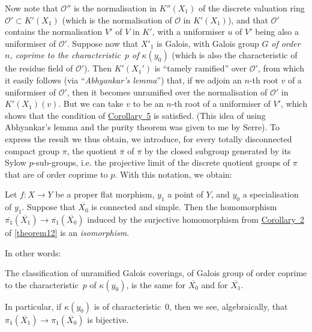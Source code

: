 \documentclass{article}
\theoremstyle{plain}
\newenvironment{theorem}[1]
  {\renewcommand\theinnercustomtheorem{#1}\innercustomtheorem}
  {\endinnercustomtheorem}
\newenvironment{corollary}[1]
  {\renewcommand\theinnercustomcorollary{#1}\innercustomcorollary}
  {\endinnercustomcorollary}
\theoremstyle{definition}
\newcommand{\sh}[1]{{\mathscr{#1}}}
\newcommand{\kres}{\kappa}
\newcommand{\oldpage}[1]{\marginpar{\footnotesize$\Big\vert$ \textit{p.~#1}}}
\begin{document}
Now note that $\sh{O}''$ is the normalisation in $K''(X_1)$ of the discrete valuation ring $\sh{O}'\subset K'(X_1)$ (which is the normalisation of $\sh{O}$ in $K'(X_1)$), and that $\sh{O}'$ contains the normalisation $V'$ of $V$ in $K'$, with a uniformiser $u$ of $V'$ being also a uniformiser of $\sh{O}'$.
Suppose now that $X'_1$ is Galois, with Galois group $G$ \emph{of order $n$, coprime to the characteristic~$p$ of $\kres(y_0)$} (which is also the characteristic of the residue field of $\sh{O}'$).
Then $K'(X_1')$ is ``tamely ramified'' over $\sh{O}'$, from which it easily follows (via ``\emph{Abhyankar's lemma}'') that, if we adjoin an $n$-th root $v$ of a uniformiser of $\sh{O}'$, then it becomes unramified over the normalisation of $\sh{O}'$ in $K'(X_1)(v)$.
But we can take $v$ to be an $n$-th root of a uniformiser of $V'$, which shows that the condition of \hyperref[theorem12corollary5]{Corollary~5} is satisfied.
(This idea of using Abhyankar's lemma and the purity theorem was given to me by Serre).
To express the result we thus obtain, we introduce, for every totally disconnected compact group $\pi$, the quotient $\overline{\pi}$ of $\pi$ by the closed subgroup generated by its Sylow $p$-sub-groups, i.e. the projective limit of the discrete quotient groups of $\pi$ that are of order coprime to $p$.
With this notation, we obtain:

\begin{theorem}{13}
\label{theorem13}
  Let $f\colon X\to Y$ be a proper flat morphism, $y_1$ a point of $Y$, and $y_0$ a specialisation of $y_1$.
  Suppose that $\overline{X_0}$ is connected and simple.
  Then the homomorphism $\overline{\pi_1}(\overline{X_1})\to\overline{\pi_1}(\overline{X_0})$ induced by the
\oldpage{182-27}
  surjective homomorphism from \hyperref[theorem12corollary2]{Corollary~2} of \cref{theorem12} is an \emph{isomorphism}.
\end{theorem}

In other words:

\begin{corollary}{1}
\label{theorem13corollary1}
  The classification of unramified Galois coverings, of Galois group of order coprime to the characteristic~$p$ of $\kres(y_0)$, is the same for $\overline{X_0}$ and for $\overline{X_1}$.
\end{corollary}

In particular, if $\kres(y_0)$ is of characteristic~$0$, then we see, algebraically, that $\pi_1(\overline{X_1})\to\pi_1(\overline{X_0})$ is bijective.
\end{document}
